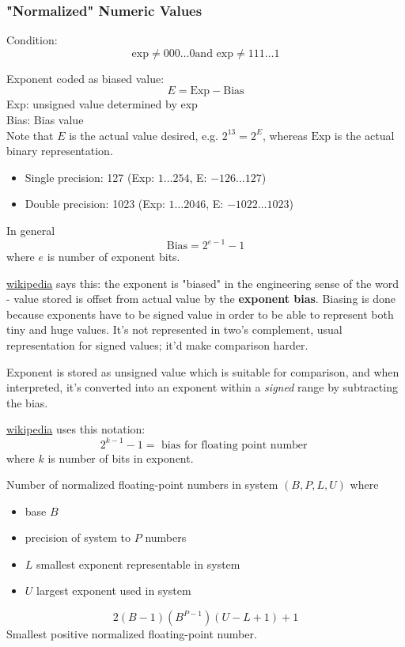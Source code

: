 \documentclass[10pt]{amsart}
\begin{document}
\subsubsection{"Normalized" Numeric Values}

Condition: \\
\[
\text{exp} \neq 000\dots 0 \text{and } \text{exp} \neq 111 \dots 1
\]

Exponent coded as biased value: \\
\begin{equation}
E = \text{Exp} - \text{Bias} 
\end{equation}
Exp: unsigned value determined by exp \\
Bias: Bias value \\

Note that $E$ is the actual value desired, e.g. $2^{13} = 2^{E}$, whereas $\text{Exp}$ is the actual binary representation.

\begin{itemize}
	\item Single precision: 127 (Exp: $1\dots 254$, E: $-126 \dots 127$) 
	\item Double precision: 1023 (Exp: $1\dots 2046$, E: $-1022 \dots 1023$) 
\end{itemize}
In general
\begin{equation}
\text{Bias} = 2^{e-1} - 1
\end{equation}
where $e$ is number of exponent bits.

\href{https://en.wikipedia.org/wiki/Exponent_bias}{wikipedia} says this: the exponent is "biased" in the engineering sense of the word - value stored is offset from actual value by the \textbf{exponent bias}. Biasing is done because exponents have to be signed value in order to be able to represent both tiny and huge values. It's not represented in two's complement, usual representation for signed values; it'd make comparison harder.

Exponent is stored as unsigned value which is suitable for comparison, and when interpreted, it's converted into an exponent within a \emph{signed} range by subtracting the bias.

\href{https://en.wikipedia.org/wiki/Exponent_bias}{wikipedia} uses this notation:
\[
2^{k-1} - 1 = \text{ bias for floating point number }
\]
where $k$ is number of bits in exponent.

Number of normalized floating-point numbers in system $(B, P, L, U)$ where 
\begin{itemize}
	\item base $B$
	\item precision of system to $P$ numbers
	\item $L$ smallest exponent representable in system
	\item $U$ largest exponent used in system
\end{itemize}
\begin{equation}
2(B-1)(B^{P-1}) (U - L + 1) + 1
\end{equation}
Smallest positive normalized floating-point number.
\end{document}
